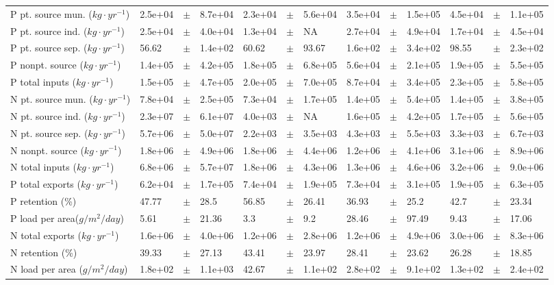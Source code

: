 \documentclass{article}
\begin{document}
\begin{landscape}
\begin{table}[!h]
\begin{tabular}{lllllllllllll}
P pt. source mun. ($kg \cdot yr^{-1}$) & 2.5e+04 & $\pm$ & 8.7e+04 & 2.3e+04 & $\pm$ & 5.6e+04 & 3.5e+04 & $\pm$ & 1.5e+05 & 4.5e+04 & $\pm$ & 1.1e+05\\
P pt. source ind. ($kg \cdot yr^{-1}$) & 2.5e+04 & $\pm$ & 4.0e+04 & 1.3e+04 & $\pm$ & NA & 2.7e+04 & $\pm$ & 4.9e+04 & 1.7e+04 & $\pm$ & 4.5e+04\\
P pt. source sep. ($kg \cdot yr^{-1}$) & 56.62 & $\pm$ & 1.4e+02 & 60.62 & $\pm$ & 93.67 & 1.6e+02 & $\pm$ & 3.4e+02 & 98.55 & $\pm$ & 2.3e+02\\
\addlinespace
P nonpt. source ($kg \cdot yr^{-1}$) & 1.4e+05 & $\pm$ & 4.2e+05 & 1.8e+05 & $\pm$ & 6.8e+05 & 5.6e+04 & $\pm$ & 2.1e+05 & 1.9e+05 & $\pm$ & 5.5e+05\\
P total inputs ($kg \cdot yr^{-1}$) & 1.5e+05 & $\pm$ & 4.7e+05 & 2.0e+05 & $\pm$ & 7.0e+05 & 8.7e+04 & $\pm$ & 3.4e+05 & 2.3e+05 & $\pm$ & 5.8e+05\\
N pt. source mun. ($kg \cdot yr^{-1}$) & 7.8e+04 & $\pm$ & 2.5e+05 & 7.3e+04 & $\pm$ & 1.7e+05 & 1.4e+05 & $\pm$ & 5.4e+05 & 1.4e+05 & $\pm$ & 3.8e+05\\
N pt. source ind. ($kg \cdot yr^{-1}$) & 2.3e+07 & $\pm$ & 6.1e+07 & 4.0e+03 & $\pm$ & NA & 1.6e+05 & $\pm$ & 4.2e+05 & 1.7e+05 & $\pm$ & 5.6e+05\\
N pt. source sep. ($kg \cdot yr^{-1}$) & 5.7e+06 & $\pm$ & 5.0e+07 & 2.2e+03 & $\pm$ & 3.5e+03 & 4.3e+03 & $\pm$ & 5.5e+03 & 3.3e+03 & $\pm$ & 6.7e+03\\
\addlinespace
N nonpt. source ($kg \cdot yr^{-1}$) & 1.8e+06 & $\pm$ & 4.9e+06 & 1.8e+06 & $\pm$ & 4.4e+06 & 1.2e+06 & $\pm$ & 4.1e+06 & 3.1e+06 & $\pm$ & 8.9e+06\\
N total inputs ($kg \cdot yr^{-1}$) & 6.8e+06 & $\pm$ & 5.7e+07 & 1.8e+06 & $\pm$ & 4.3e+06 & 1.3e+06 & $\pm$ & 4.6e+06 & 3.2e+06 & $\pm$ & 9.0e+06\\
P total exports ($kg \cdot yr^{-1}$) & 6.2e+04 & $\pm$ & 1.7e+05 & 7.4e+04 & $\pm$ & 1.9e+05 & 7.3e+04 & $\pm$ & 3.1e+05 & 1.9e+05 & $\pm$ & 6.3e+05\\
P retention (\%) & 47.77 & $\pm$ & 28.5 & 56.85 & $\pm$ & 26.41 & 36.93 & $\pm$ & 25.2 & 42.7 & $\pm$ & 23.34\\
P load per area($g / m^{2} / day$) & 5.61 & $\pm$ & 21.36 & 3.3 & $\pm$ & 9.2 & 28.46 & $\pm$ & 97.49 & 9.43 & $\pm$ & 17.06\\
\addlinespace
N total exports ($kg \cdot yr^{-1}$) & 1.6e+06 & $\pm$ & 4.0e+06 & 1.2e+06 & $\pm$ & 2.8e+06 & 1.2e+06 & $\pm$ & 4.9e+06 & 3.0e+06 & $\pm$ & 8.3e+06\\
N retention (\%) & 39.33 & $\pm$ & 27.13 & 43.41 & $\pm$ & 23.97 & 28.41 & $\pm$ & 23.62 & 26.28 & $\pm$ & 18.85\\
N load per area ($g / m^{2} / day$) & 1.8e+02 & $\pm$ & 1.1e+03 & 42.67 & $\pm$ & 1.1e+02 & 2.8e+02 & $\pm$ & 9.1e+02 & 1.3e+02 & $\pm$ & 2.4e+02\\
\bottomrule
\end{tabular}
\end{table}
\end{landscape}
\end{document}
